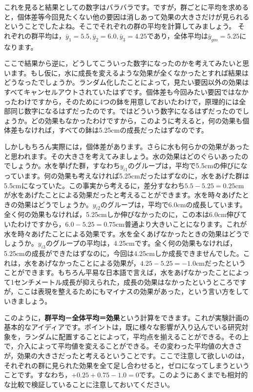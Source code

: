 \documentclass{ltjbook}
\begin{document}
これを見ると結果としての数字はバラバラです。ですが，群ごとに平均を求めると，個体差等今回見たくない他の要因は消しあって効果の大きさだけが見られるということでしたよね。そこでそれぞれの群の平均を計算してみましょう。
それぞれの群平均は，$\bar{y}_1 = 5.5,\bar{y}_2 = 6.0,\bar{y}_3 = 4.25$であり，全体平均は$\bar{y}_{gm}= 5.25$になります。

ここで結果から逆に，どうしてこういった数字になったのかを考えてみたいと思います。もし仮に，水に成長を変えるような効果が全くなかったとすれば結果はどうなったでしょうか。ランダム化したことによって，見たい要因以外の効果はすべてキャンセルアウトされていたはずです。個体差も今回みたい要因ではなかったわけですから，そのために4つの鉢を用意しておいたわけで，原理的には全部同じ数字になるはずだったのです。ではどういう数字になるはずだったのでしょうか。どの効果もなかったわけですから，このように考えると，何の効果も個体差もなければ，すべての鉢は5.25cmの成長だったはずなのです。

しかしもちろん実際には，個体差があります。さらに水も何らかの効果があったと思われます。その大きさを考えてみましょう。水の効果はどのぐらいあったのでしょうか。水を挙げた群，すなわち$y_{i1}$のグループは，平均で5.5cmの伸びになっています。何の効果も考えなければ5.25cmだったはずなのに，水をあげた群は5.5cmになっていた。この事実から考えるに，差分すなわち$5.5-5.25=0.25$cmが水をあげたことによる効果だったと考えることができます。水を時々あげたときの効果はどうでしょうか。$y_{i2}$のグループは，平均で6.0cmの成長しています。全く何の効果もなければ，5.25cmしか伸びなかったのに，この本は6.0cm伸びていたわけですから，$6.0-5.25=0.75$cm普通より大きいことになります。これが水を時々あげたことによる効果です。水を全くあげなかったときの効果はどうでしょうか。$y_{i3}$のグループの平均は，4.25cmです。全く何の効果もなければ，5.25cmの成長ができたはずなのに，今回は4.25cmしか成長できませんでした。これは，水をあげなかったことによる効果が，$4.25-5.25=-1.0$cmだったということができます。もちろん平易な日本語で言えば，水をあげなかったことによって1センチメートル成長が抑えられた，成長の効果はなかったというところですが，ここは表現を整えるためにもマイナスの効果があった，という言い方をしていきましょう。

このように，\textbf{群平均－全体平均＝効果}という計算をできます。これが実験計画の基本的なアイディアです。ポイントは，既に様々な影響が入り込んでいる研究対象を，ランダムに配置することによって，平均点を揃えることができる。その上で，介入によって平均値を変えることができる。その変わった平均値の大きさが，効果の大きさだったと考えるということです。ここで注意して欲しいのは，それぞれの群に見られた効果を全て足し合わせると，ゼロになってしまうということです。すなわち，$+0.25+0.75-1.0=0$です。このようにあくまでも相対的な比較で検証していることに注意しておいてください。
\end{document}
